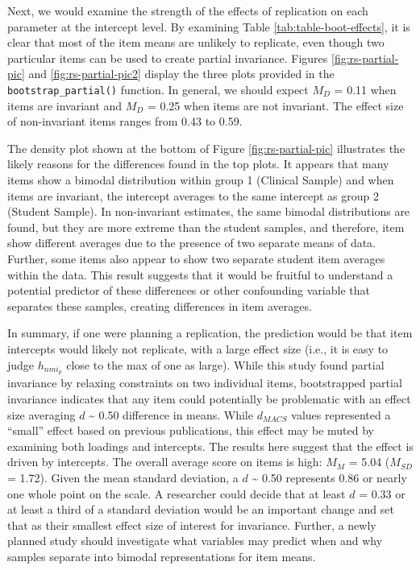 \documentclass[
  man,floatsintext]{apa7}
\begin{document}
Next, we would examine the strength of the effects of replication on each parameter at the intercept level. By examining Table \ref{tab:table-boot-effects}, it is clear that most of the item means are unlikely to replicate, even though two particular items can be used to create partial invariance. Figures \ref{fig:rs-partial-pic} and \ref{fig:rs-partial-pic2} display the three plots provided in the \texttt{bootstrap\_partial()} function. In general, we should expect \(M_{D}\) = 0.11 when items are invariant and \(M_{D}\) = 0.25 when items are not invariant. The effect size of non-invariant items ranges from 0.43 to 0.59.

The density plot shown at the bottom of Figure \ref{fig:rs-partial-pic} illustrates the likely reasons for the differences found in the top plots. It appears that many items show a bimodal distribution within group 1 (Clinical Sample) and when items are invariant, the intercept averages to the same intercept as group 2 (Student Sample). In non-invariant estimates, the same bimodal distributions are found, but they are more extreme than the student samples, and therefore, item show different averages due to the presence of two separate means of data. Further, some items also appear to show two separate student item averages within the data. This result suggests that it would be fruitful to understand a potential predictor of these differences or other confounding variable that separates these samples, creating differences in item averages.

In summary, if one were planning a replication, the prediction would be that item intercepts would likely not replicate, with a large effect size (i.e., it is easy to judge \(h_{nmi_p}\) close to the max of one as large). While this study found partial invariance by relaxing constraints on two individual items, bootstrapped partial invariance indicates that any item could potentially be problematic with an effect size averaging \(d\) \textasciitilde{} 0.50 difference in means. While \(d_{MACS}\) values represented a ``small'' effect based on previous publications, this effect may be muted by examining both loadings and intercepts. The results here suggest that the effect is driven by intercepts. The overall average score on items is high: \(M_M\) = 5.04 (\(M_{SD}\) = 1.72). Given the mean standard deviation, a \(d\) \textasciitilde{} 0.50 represents 0.86 or nearly one whole point on the scale. A researcher could decide that at least \(d\) = 0.33 or at least a third of a standard deviation would be an important change and set that as their smallest effect size of interest for invariance. Further, a newly planned study should investigate what variables may predict when and why samples separate into bimodal representations for item means.
\end{document}
